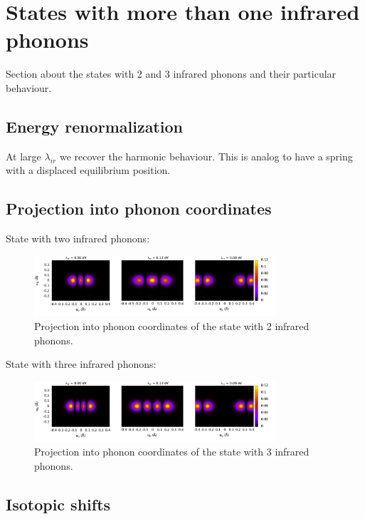 \chapter{States with more than one infrared phonons}

Section about the states with 2 and 3 infrared phonons and their particular behaviour.

\section{Energy renormalization}

At large $\lambda_{ir}$ we recover the harmonic behaviour. This is analog to have a spring with a displaced equilibrium position.

\section{Projection into phonon coordinates}

State with two infrared phonons:

\begin{figure}[ht!]
\centering
\includegraphics[width=0.8\textwidth]{images/ph-second_infrared.png}
\caption{Projection into phonon coordinates of the state with 2 infrared phonons.}
\label{fig:ph-second_infrared}
\end{figure}

State with three infrared phonons:

\begin{figure}[ht!]
\centering
\includegraphics[width=0.8\textwidth]{images/ph-third_infrared.png}
\caption{Projection into phonon coordinates of the state with 3 infrared phonons.}
\label{fig:ph-third_infrared}
\end{figure}

\section{Isotopic shifts}

